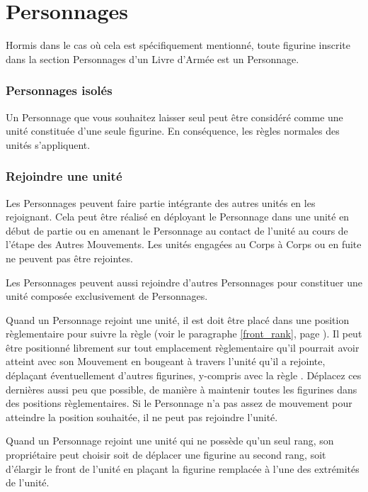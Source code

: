 
\part{Personnages}
\label{characters}

Hormis dans le cas où cela est spécifiquement mentionné, toute figurine inscrite dans la section Personnages d'un Livre d'Armée est un Personnage.

\section{Personnages isolés}

Un Personnage que vous souhaitez laisser seul peut être considéré comme une unité constituée d'une seule figurine. En conséquence, les règles normales des unités s'appliquent.

\section{Rejoindre une unité}

Les Personnages peuvent faire partie intégrante des autres unités en les rejoignant. Cela peut être réalisé en déployant le Personnage dans une unité en début de partie ou en amenant le Personnage au contact de l'unité au cours de l'étape des Autres Mouvements. Les unités engagées au Corps à Corps ou en fuite ne peuvent pas être rejointes.

Les Personnages peuvent aussi rejoindre d'autres Personnages pour constituer une unité composée exclusivement de Personnages.

Quand un Personnage rejoint une unité, il est doit être placé dans une position règlementaire pour suivre la règle \frontrank{} (voir le paragraphe \ref{front_rank}, page \pageref{front_rank}). Il peut être positionné librement sur tout emplacement règlementaire qu'il pourrait avoir atteint avec son Mouvement en bougeant à travers l'unité qu'il a rejointe, déplaçant éventuellement d'autres figurines, y-compris avec la règle \frontrank{}. Déplacez ces dernières aussi peu que possible, de manière à maintenir toutes les figurines dans des positions règlementaires. Si le Personnage n'a pas assez de mouvement pour atteindre la position souhaitée, il ne peut pas rejoindre l'unité.

Quand un Personnage rejoint une unité qui ne possède qu'un seul rang, son propriétaire peut choisir soit de déplacer une figurine au second rang, soit d'élargir le front de l'unité en plaçant la figurine remplacée à l'une des extrémités de l'unité.

